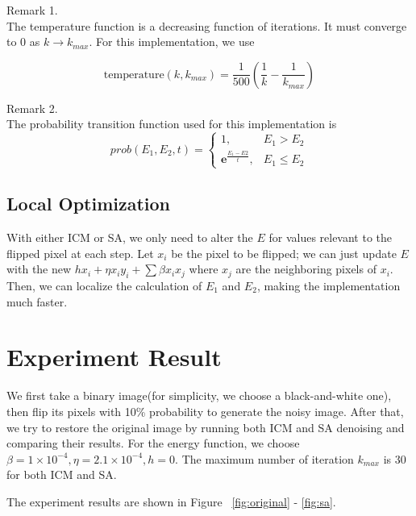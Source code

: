 \documentclass[conference]{IEEEtran}
\begin{document}
\begin{description}
\item Remark 1.\hfill \\
The temperature function is a decreasing function of iterations. It must converge to $0$ as $k \to k_{max}$. For this implementation, we use

$$
\text{temperature}(k, k_{max}) = \frac{1}{500}(\frac{1}{k} - \frac{1}{k_{max}})
$$
\item Remark 2.\hfill \\
The probability transition function used for this implementation is
$$
prob(E_1, E_2, t) =  \left\{
     \begin{array}{lr}
       1, & E_1 > E_2 \\
       \mathbf{e}^{\frac{E_1 - E2}{t}}, & E_1 \leq E_2
     \end{array}
   \right.
$$
\end{description}

\subsection{Local Optimization}
With either ICM or SA, we only need to alter the $E$ for values relevant to the flipped pixel at each step. Let $x_i$ be the pixel to be flipped; we can just update $E$ with the new $hx_i + \eta x_i y_i + \sum \beta x_i x_j$ where $x_j$ are the neighboring pixels of $x_i$. Then, we can localize the calculation of $E_1$ and $E_2$, making the implementation much faster.

\section{Experiment Result}
We first take a binary image(for simplicity, we choose a black-and-white one), then flip its pixels with 10\% probability to generate the noisy image. After that, we try to restore the original image by running both ICM and SA denoising and comparing their results. For the energy function, we choose $\beta = 1 \times 10^{-4}, \eta = 2.1 \times 10^{-4}, h = 0$. The maximum number of iteration $k_{max}$ is $30$ for both ICM and SA.

The experiment results are shown in Figure ~\ref{fig:original} - \ref{fig:sa}.
\end{document}
